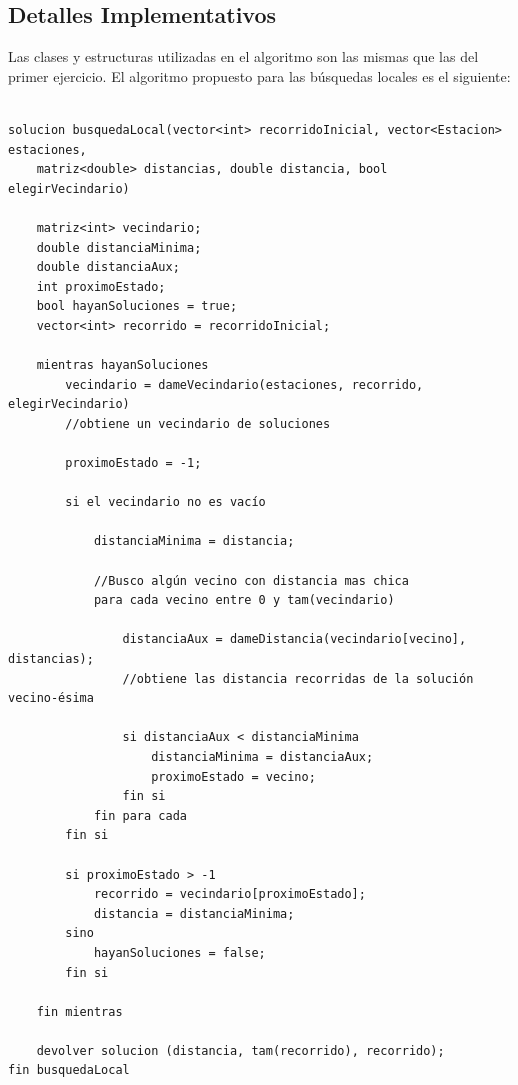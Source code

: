    \subsection{Detalles Implementativos}

    
    Las clases y estructuras utilizadas en el algoritmo son las mismas que las del primer ejercicio. El algoritmo propuesto para las búsquedas locales es el siguiente: 

            \begin{codesnippet}
            \begin{verbatim}

solucion busquedaLocal(vector<int> recorridoInicial, vector<Estacion> estaciones, 
    matriz<double> distancias, double distancia, bool elegirVecindario)
    
    matriz<int> vecindario;
    double distanciaMinima;
    double distanciaAux;
    int proximoEstado;
    bool hayanSoluciones = true;
    vector<int> recorrido = recorridoInicial;

    mientras hayanSoluciones
        vecindario = dameVecindario(estaciones, recorrido, elegirVecindario)
        //obtiene un vecindario de soluciones
        
        proximoEstado = -1;

        si el vecindario no es vacío
            
            distanciaMinima = distancia;
            
            //Busco algún vecino con distancia mas chica
            para cada vecino entre 0 y tam(vecindario)
                
                distanciaAux = dameDistancia(vecindario[vecino], distancias);
                //obtiene las distancia recorridas de la solución vecino-ésima

                si distanciaAux < distanciaMinima
                    distanciaMinima = distanciaAux;
                    proximoEstado = vecino;
                fin si
            fin para cada
        fin si
    
        si proximoEstado > -1
            recorrido = vecindario[proximoEstado];
            distancia = distanciaMinima;
        sino
            hayanSoluciones = false;
        fin si

    fin mientras

    devolver solucion (distancia, tam(recorrido), recorrido);
fin busquedaLocal
            \end{verbatim}
            \end{codesnippet}


